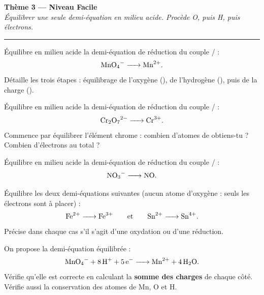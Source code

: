 \documentclass[11pt,a4paper]{article}
\newcounter{exo}
\begin{document}
\begin{center}
{\LARGE\bfseries\color{primarydark}Thème 3 — Niveau Facile}\\[2pt]
{\small\itshape Équilibrer une seule demi-équation en milieu acide. Procède O, puis H, puis électrons.}\\[-4pt]
{\color{primary}\rule{\textwidth}{1pt}}
\end{center}

\begin{exo}
Équilibre en milieu acide la demi-équation de réduction du couple / :
\[
\ce{MnO4^- -> Mn^{2+}}.
\]
Détaille les trois étapes : équilibrage de l'oxygène (), de l'hydrogène (), puis de
la charge ().
\end{exo}

\begin{exo}
Équilibre en milieu acide la demi-équation de réduction du couple / :
\[
\ce{Cr2O7^{2-} -> Cr^{3+}}.
\]
Commence par équilibrer l'élément chrome : combien d'atomes de  obtiens-tu ? Combien
d'électrons au total ?
\end{exo}

\begin{exo}
Équilibre en milieu acide la demi-équation de réduction du couple / :
\[
\ce{NO3^- -> NO}.
\]
\end{exo}

\begin{exo}
Équilibre les deux demi-équations suivantes (aucun atome d'oxygène : seuls les électrons sont à
placer) :
\[
\ce{Fe^{2+} -> Fe^{3+}} \qquad\text{et}\qquad \ce{Sn^{2+} -> Sn^{4+}}.
\]
Précise dans chaque cas s'il s'agit d'une oxydation ou d'une réduction.
\end{exo}

\begin{exo}
On propose la demi-équation équilibrée :
\[
\ce{MnO4^- + 8 H+ + 5 e^- -> Mn^{2+} + 4 H2O}.
\]
Vérifie qu'elle est correcte en calculant la \textbf{somme des charges} de chaque côté. Vérifie aussi
la conservation des atomes de Mn, O et H.
\end{exo}
\end{document}
